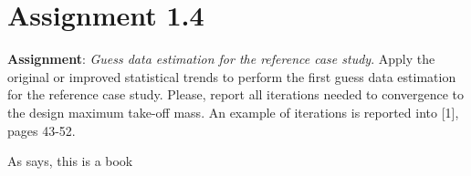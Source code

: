 \documentclass{article}
\begin{document}
\section{Assignment 1.4}
\textbf{Assignment}: \textit{Guess data estimation for the reference
case study}. Apply the original or improved statistical trends to
perform the first guess data estimation for the reference case
study. Please, report all iterations needed to convergence to the
design maximum take-off mass. An example of iterations is
reported into [1], pages 43-52.
\newline 

As \textcite{example} says, this is a book
\printbibliography
    
\end{document}
